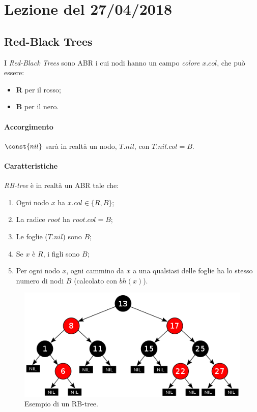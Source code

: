 \section{Lezione del 27/04/2018}

\subsection{Red-Black Trees}

I \emph{Red-Black Trees} sono ABR i cui nodi hanno un campo \emph{colore} $x.col$, che può essere:
\begin{itemize}[noitemsep]
    \item \textbf{R} per il rosso;
    \item \textbf{B} per il nero.
\end{itemize}

\paragraph{Accorgimento} $\const{nil}$ sarà in realtà un nodo,
$T.nil$, con $T.nil.col = B$.

\paragraph{Caratteristiche} \emph{RB-tree} è in realtà un ABR tale che:
\begin{enumerate}[label=($\arabic*$)]
    \item Ogni nodo $x$ ha $x.col \in \{R,B\}$;
    \item La radice $root$ ha $root.col = B$;
    \item Le foglie ($T.nil$) sono $B$;
    \item Se $x$ è $R$, i figli sono $B$;
    \item Per ogni nodo $x$, ogni cammino da $x$ a una qualsiasi delle foglie
    ha lo stesso numero di nodi $B$ (calcolato con $bh(x)$).
\end{enumerate} 

\begin{figure}[hbt]
    \centering
    \includegraphics[width=\textwidth]{img/rb-tree-ex.png}
    \caption{Esempio di un RB-tree.}
\end{figure}
\pagebreak

